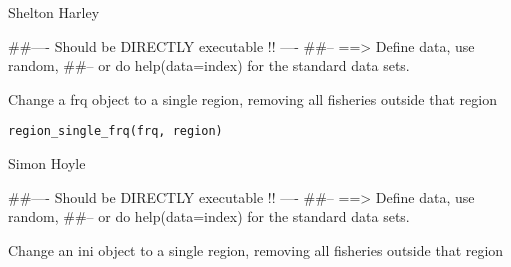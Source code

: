 \documentclass[a4paper]{book}
\begin{document}
%
\begin{Author}\relax

Shelton Harley
\end{Author}
%
\begin{Examples}
\begin{ExampleCode}
##---- Should be DIRECTLY executable !! ----
##-- ==>  Define data, use random,
##--	or do  help(data=index)  for the standard data sets.

\end{ExampleCode}
\end{Examples}
%
\begin{Description}\relax

Change a frq object to a single region, removing all fisheries outside that region
\end{Description}
%
\begin{Usage}
\begin{verbatim}
region_single_frq(frq, region)
\end{verbatim}
\end{Usage}
%
\begin{Arguments}
\begin{ldescription}
\item[\code{frq}] 


\item[\code{region}] 


\end{ldescription}
\end{Arguments}
%
\begin{Author}\relax

Simon Hoyle
\end{Author}
%
\begin{Examples}
\begin{ExampleCode}
##---- Should be DIRECTLY executable !! ----
##-- ==>  Define data, use random,
##--	or do  help(data=index)  for the standard data sets.

\end{ExampleCode}
\end{Examples}
%
\begin{Description}\relax

Change an ini object to a single region, removing all fisheries outside that region
\end{Description}
\end{document}
